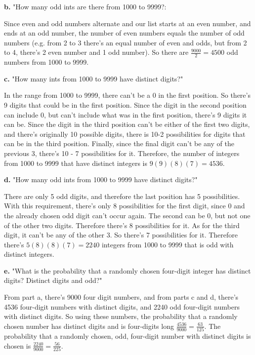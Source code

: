 \documentclass{article}
\begin{document}
\item[]\textbf{b.} "How many odd ints are there from 1000 to 9999?:
\item Since even and odd numbers alternate and our list starts at an even number, and ends at an odd number, the number of even numbers equals the number of odd numbers (e.g. from 2 to 3 there's an equal number of even and odds, but from 2 to 4, there's 2 even number and 1 odd number). So there are $\frac{9000}{2} = 4500$ odd numbers from 1000 to 9999.

\item[]\textbf{c.} "How many ints from 1000 to 9999 have distinct digits?"
\item In the range from 1000 to 9999, there can't be a 0 in the first position. So there's 9 digits that could be in the first position. Since the digit in the second position can include 0, but can't include what was in the first position, there's 9 digits it can be. Since the digit in the third position can't be either of the first two digits, and there's originally 10 possible digits, there is 10-2 possibilities for digits that can be in the third position. Finally, since the final digit can't be any of the previous 3, there's 10 - 7 possibilities for it. Therefore, the number of integers from 1000 to 9999 that have distinct integers is $9(9)(8)(7) = 4536$.

\item[]\textbf{d.} "How many odd ints from 1000 to 9999 have distinct digits?"
\item There are only 5 odd digits, and therefore the last position has 5 possibilities. With this requirement, there's only 8 possibilities for the first digit, since 0 and the already chosen odd digit can't occur again. The second can be 0, but not one of the other two digits. Therefore there's 8 possibilities for it. As for the third digit, it can't be any of the other 3. So there's 7 possibilities for it. Therefore there's $5(8)(8)(7) = 2240$ integers from 1000 to 9999 that is odd with distinct integers.

\item[]\textbf{e.} "What is the probability that a randomly chosen four-digit integer has distinct digits? Distinct digits and odd?"

\item From part a, there's 9000 four digit numbers, and from parts c and d, there's 4536 four-digit numbers with distinct digits, and 2240 odd four-digit numbers with distinct digits. So using these numbers, the probability that a randomly chosen number has distinct digits and  is four-digits long $\frac{4536}{9000} = \frac{63}{125}$. The probability that a randomly chosen, odd, four-digit number with distinct digits is chosen is $\frac{2240}{9000} = \frac{56}{225}$.
\end{document}
